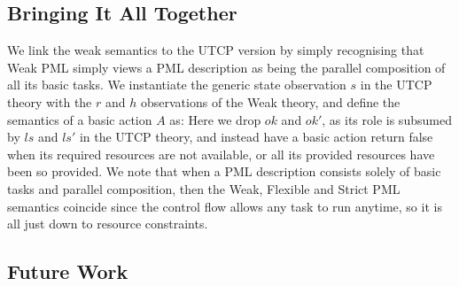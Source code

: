 \subsection{Bringing It All Together}\label{ha:unify}

We link the weak semantics to the UTCP version
by simply recognising that Weak PML simply views a PML description
as being the parallel composition of all its basic tasks.
We instantiate the generic state observation $s$
in the UTCP theory with the $r$ and $h$ observations of
the Weak theory, and define the semantics of a basic action $A$
as:
Here we drop $ok$ and $ok'$, as its role is subsumed by $ls$  and $ls'$
in the UTCP theory, and instead have a basic action return false when
its required resources are not available,
or all its provided resources
have been so provided.
We note that when a PML description consists solely of basic tasks
and parallel composition, then the Weak, Flexible and Strict PML semantics
coincide since the control flow allows any task to run anytime,
so it is all just down to resource constraints.



\subsection{Future Work}\label{ha:future}

